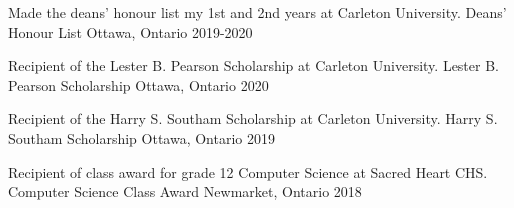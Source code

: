 


\begin{cvhonors}
  \cventry
    {Made the deans' honour list my 1st and 2nd years at Carleton University.} %
    {Deans' Honour List} %
    {Ottawa, Ontario} %
    {2019-2020} %
    {} %
    
  \cventry
    {Recipient of the Lester B. Pearson Scholarship at Carleton University.} %
    {Lester B. Pearson Scholarship} %
    {Ottawa, Ontario} %
    {2020} %
    {} %

  \cventry
    {Recipient of the Harry S. Southam Scholarship at Carleton University.} %
    {Harry S. Southam Scholarship} %
    {Ottawa, Ontario} %
    {2019} %
    {} %

  \cventry
    {Recipient of class award for grade 12 Computer Science at Sacred Heart CHS.} %
    {Computer Science Class Award} %
    {Newmarket, Ontario} %
    {2018} %
    {} %


\end{cvhonors}
